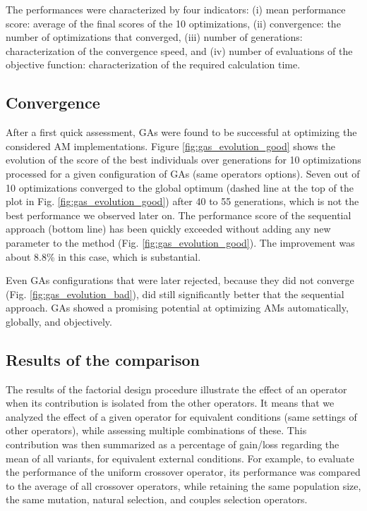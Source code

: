 \documentclass{ametsoc}
\begin{document}
The performances were characterized by four indicators: (i) mean performance score: average of the final scores of the 10 optimizations, (ii) convergence: the number of optimizations that converged, (iii) number of generations: characterization of the convergence speed, and (iv) number of evaluations of the objective function: characterization of the required calculation time.


\subsection{Convergence}

After a first quick assessment, GAs were found to be successful at optimizing the considered AM implementations. Figure \ref{fig:gas_evolution_good} shows the evolution of the score of the best individuals over generations for 10 optimizations processed for a given configuration of GAs (same operators options). Seven out of 10 optimizations converged to the global optimum (dashed line at the top of the plot in Fig. \ref{fig:gas_evolution_good}) after 40 to 55 generations, which is not the best performance we observed later on. The performance score of the sequential approach (bottom line) has been quickly exceeded without adding any new parameter to the method (Fig. \ref{fig:gas_evolution_good}). The improvement was about 8.8\% in this case, which is substantial.

Even GAs configurations that were later rejected, because they did not converge (Fig. \ref{fig:gas_evolution_bad}), did still significantly better that the sequential approach. GAs showed a promising potential at optimizing AMs automatically, globally, and objectively.


\subsection{Results of the comparison}
\label{sec:assessment:results}

The results of the factorial design procedure illustrate the effect of an operator when its contribution is isolated from the other operators. It means that we analyzed the effect of a given operator for equivalent conditions (same settings of other operators), while assessing multiple combinations of these. This contribution was then summarized as a percentage of gain/loss regarding the mean of all variants, for equivalent external conditions. For example, to evaluate the performance of the uniform crossover operator, its performance was compared to the average of all crossover operators, while retaining the same population size, the same mutation, natural selection, and couples selection operators.
\end{document}
